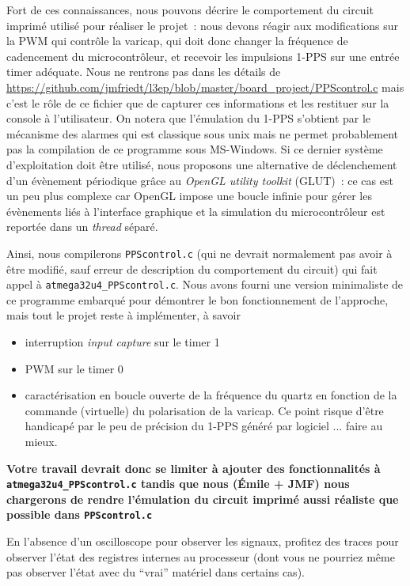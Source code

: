 \documentclass[a4paper]{article}
\begin{document}
Fort de ces connaissances, nous pouvons d\'ecrire le comportement du circuit 
imprim\'e utilis\'e pour r\'ealiser le projet~: nous devons r\'eagir aux 
modifications sur la PWM qui contr\^ole la varicap, qui doit donc changer la 
fr\'equence de cadencement du microcontr\^oleur, et recevoir les impulsions 
1-PPS sur une entr\'ee timer ad\'equate. Nous ne rentrons pas dans les 
d\'etails de 
\url{https://github.com/jmfriedt/l3ep/blob/master/board_project/PPScontrol.c} 
mais c'est le r\^ole de ce fichier que de capturer ces informations et les 
restituer sur la console \`a l'utilisateur. On notera que l'\'emulation du 
1-PPS s'obtient par le m\'ecanisme des alarmes qui est classique sous unix 
mais ne permet probablement pas la compilation de ce programme sous MS-Windows. 
Si ce dernier syst\`eme d'exploitation doit \^etre utilis\'e, nous proposons
une alternative de d\'eclenchement d'un \'ev\`enement p\'eriodique gr\^ace
au {\em OpenGL utility toolkit} (GLUT)~: ce cas est un peu plus complexe
car OpenGL impose une boucle infinie pour g\'erer les \'ev\`enements li\'es
\`a l'interface graphique et la simulation du microcontr\^oleur est report\'ee
dans un {\em thread} s\'epar\'e.

Ainsi, nous compilerons {\tt PPScontrol.c} (qui ne devrait normalement pas 
avoir \`a \^etre modifi\'e, sauf erreur de description du comportement du 
circuit) qui fait appel \`a {\tt atmega32u4\_PPScontrol.c}. Nous avons fourni 
une version minimaliste de ce programme embarqu\'e pour d\'emontrer le bon
fonctionnement de l'approche, mais tout le projet reste \`a impl\'ementer, 
\`a savoir
\begin{itemize}
\item interruption {\em input capture} sur le timer 1
\item PWM sur le timer 0
\item caract\'erisation en boucle ouverte de la fr\'equence du quartz en 
fonction de la commande (virtuelle) du polarisation de la varicap. Ce point
risque d'\^etre handicap\'e par le peu de pr\'ecision du 1-PPS g\'en\'er\'e
par logiciel ... faire au mieux.
\end{itemize}

{\bf Votre travail devrait donc se limiter \`a ajouter des fonctionnalit\'es 
\`a {\tt atmega32u4\_PPScontrol.c} tandis que nous (\'Emile + JMF) nous 
chargerons de rendre l'\'emulation du circuit imprim\'e aussi r\'ealiste que 
possible dans {\tt PPScontrol.c}}

En l'absence d'un oscilloscope pour observer les signaux, profitez des traces 
pour observer l'\'etat des registres internes au processeur (dont vous ne 
pourriez m\^eme pas observer l'\'etat avec du ``vrai'' mat\'eriel dans 
certains cas).
\end{document}
